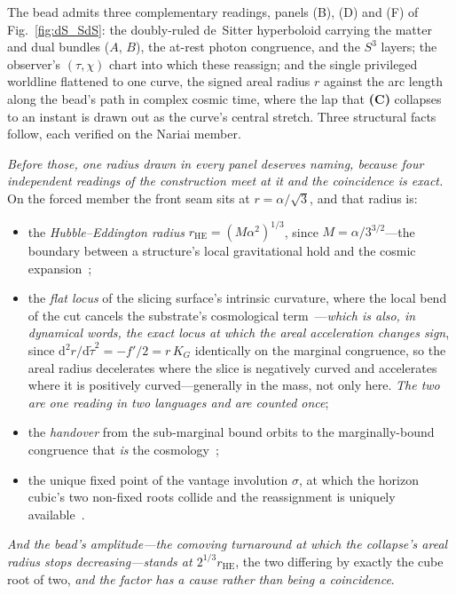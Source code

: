 \documentclass[11pt,a4paper]{article}
\theoremstyle{plain}
\theoremstyle{definition}
\theoremstyle{remark}
\newcommand{\dd}{\mathrm{d}}
\begin{document}
\begin{figure}[htbp]
\label{fig:F-triptych}
\end{figure}

\medskip
\noindent The bead admits three complementary readings, panels (B), (D) and (F) of Fig.~\ref{fig:dS_SdS}: the doubly-ruled de~Sitter hyperboloid carrying the matter and dual bundles ($A$, $B$), the at-rest photon congruence, and the $S^3$ layers; the observer's $(\tau,\chi)$ chart into which these reassign; and the single privileged worldline flattened to one curve, the signed areal radius $r$ against the arc length along the bead's path in complex cosmic time, where the lap that \textbf{(C)} collapses to an instant is drawn out as the curve's central stretch. Three structural facts follow, each verified on the Nariai member.

\medskip
\noindent\emph{Before those, one radius drawn in every panel deserves naming, because four independent readings
of the construction meet at it and the coincidence is exact.} On the forced member the front seam sits at
$r=\alpha/\sqrt3$, and that radius is:
\begin{itemize}
\item the \emph{Hubble--Eddington radius} $r_{\mathrm{HE}}=(M\alpha^{2})^{1/3}$, since $M=\alpha/3^{3/2}$---the
boundary between a structure's local gravitational hold and the cosmic expansion~\cite{JanzenSlicing};
\item the \emph{flat locus} of the slicing surface's intrinsic curvature, where the local bend of the cut
cancels the substrate's cosmological term~\cite{JanzenSlicing}---\emph{which is also, in dynamical words, the
exact locus at which the areal acceleration changes sign}, since $\dd^{2}r/\dd\tilde\tau^{2}=-f'/2=r\,K_{G}$
identically on the marginal congruence, so the areal radius decelerates where the slice is negatively curved
and accelerates where it is positively curved---generally in the mass, not only here. \emph{The two are one
reading in two languages and are counted once};
\item the \emph{handover} from the sub-marginal bound orbits to the marginally-bound congruence that \emph{is}
the cosmology~\cite{JanzenOperator};
\item the unique fixed point of the vantage involution $\sigma$, at which the horizon cubic's two non-fixed
roots collide and the reassignment is uniquely available~\cite{JanzenGroupoid}.
\end{itemize}
\emph{And the bead's amplitude---the comoving turnaround at which the collapse's areal radius stops
decreasing---stands at $2^{1/3}r_{\mathrm{HE}}$}, the two differing by exactly the cube root of two,
\emph{and the factor has a cause rather than being a coincidence}. 
\end{document}
